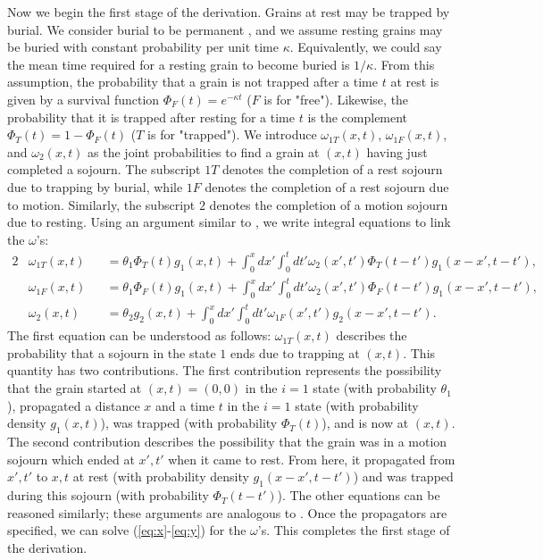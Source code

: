 \documentclass[]{agujournal2018}
\newcommand\om{\omega}
\begin{document}
Now we begin the first stage of the derivation.
Grains at rest may be trapped by burial.
We consider burial to be permanent \citep[e.g.][]{Wu2019}, and we assume resting grains may be buried with constant probability per unit time $\kappa$.
Equivalently, we could say the mean time required for a resting grain to become buried is $1/\kappa$.
From this assumption, the probability that a grain is not trapped after a time $t$ at rest is given by a survival function $\Phi_F(t) = e^{-\kappa t}$ ($F$ is for "free"). Likewise, the probability that it is trapped after resting for a time $t$ is the complement $\Phi_T(t) = 1-\Phi_F(t)$ ($T$ is for "trapped").
We introduce $\omega_{1T}(x,t)$, $\omega_{1F}(x,t)$, and $\omega_2(x,t)$ as the joint probabilities to find a grain at $(x,t)$ having just completed a sojourn.
The subscript ${1T}$ denotes the completion of a rest sojourn due to trapping by burial, while $1F$ denotes the completion of a rest sojourn due to motion.
Similarly, the subscript $2$ denotes the completion of a motion sojourn due to resting.
Using an argument similar to \citet{Weiss1994}, we write integral equations to link the $\omega$'s: 
\begin{alignat}{2}
&\om_{1T}(x,t) &&= \theta_1\Phi_T(t)g_1(x,t) + \int_0^x dx' \int_0^t dt' \om_2(x',t')\Phi_T(t-t')g_1(x-x',t-t')\label{eq:x},\\
&\om_{1F}(x,t) &&= \theta_1\Phi_F(t)g_1(x,t) + \int_0^x dx' \int_0^t dt' \om_2(x',t') \Phi_F(t-t') g_1(x-x',t-t'),\\
&\om_2(x,t) &&= \theta_2 g_2(x,t) + \int_0^x dx' \int_0^t dt' \om_{1F}(x',t')g_2(x-x',t-t'). \label{eq:y}
\end{alignat}
The first equation can be understood as follows: $\omega_{1T}(x,t)$ describes the probability that a sojourn in the state $1$ ends due to trapping at $(x,t)$. This quantity has two contributions. The first contribution represents the possibility that the grain started at $(x,t)=(0,0)$ in the $i=1$ state (with probability $\theta_1$), propagated a distance $x$ and a time $t$ in the $i=1$ state (with probability density $g_1(x,t)$), was trapped (with probability $\Phi_T(t)$), and is now at $(x,t)$. 
The second contribution describes the possibility that the grain was in a motion sojourn which ended at $x',t'$ when it came to rest. From here, it propagated from $x',t'$ to $x,t$ at rest (with probability density $g_1(x-x',t-t')$) and was trapped during this sojourn (with probability $\Phi_T(t-t')$).
The other equations can be reasoned similarly; these arguments are analogous to \citet{Weiss1994}.
Once the propagators are specified, we can solve (\ref{eq:x}-\ref{eq:y}) for the $\omega$'s. This completes the first stage of the derivation.
\end{document}
